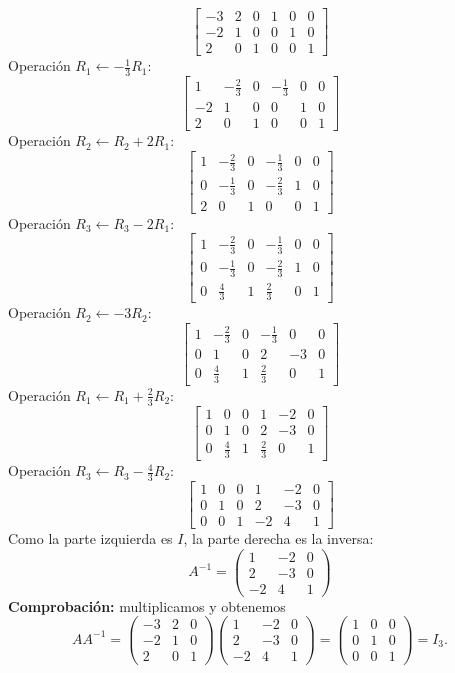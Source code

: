 \documentclass[12pt]{article}
\theoremstyle{remark}
\begin{document}
\[
\left[\begin{array}{rrr|rrr}-3&2&0&1&0&0\\-2&1&0&0&1&0\\2&0&1&0&0&1\end{array}\right]
\]
Operación $R_{1}\leftarrow - \frac{1}{3}R_{1}$:
\[
\left[\begin{array}{rrr|rrr}1&- \frac{2}{3}&0&- \frac{1}{3}&0&0\\-2&1&0&0&1&0\\2&0&1&0&0&1\end{array}\right]
\]
Operación $R_{2}\leftarrow R_{2}+2R_{1}$:
\[
\left[\begin{array}{rrr|rrr}1&- \frac{2}{3}&0&- \frac{1}{3}&0&0\\0&- \frac{1}{3}&0&- \frac{2}{3}&1&0\\2&0&1&0&0&1\end{array}\right]
\]
Operación $R_{3}\leftarrow R_{3}-2R_{1}$:
\[
\left[\begin{array}{rrr|rrr}1&- \frac{2}{3}&0&- \frac{1}{3}&0&0\\0&- \frac{1}{3}&0&- \frac{2}{3}&1&0\\0&\frac{4}{3}&1&\frac{2}{3}&0&1\end{array}\right]
\]
Operación $R_{2}\leftarrow -3R_{2}$:
\[
\left[\begin{array}{rrr|rrr}1&- \frac{2}{3}&0&- \frac{1}{3}&0&0\\0&1&0&2&-3&0\\0&\frac{4}{3}&1&\frac{2}{3}&0&1\end{array}\right]
\]
Operación $R_{1}\leftarrow R_{1}+\frac{2}{3}R_{2}$:
\[
\left[\begin{array}{rrr|rrr}1&0&0&1&-2&0\\0&1&0&2&-3&0\\0&\frac{4}{3}&1&\frac{2}{3}&0&1\end{array}\right]
\]
Operación $R_{3}\leftarrow R_{3}-\frac{4}{3}R_{2}$:
\[
\left[\begin{array}{rrr|rrr}1&0&0&1&-2&0\\0&1&0&2&-3&0\\0&0&1&-2&4&1\end{array}\right]
\]
Como la parte izquierda es $I$, la parte derecha es la inversa:
\[
\boxed{A^{-1}=\begin{pmatrix}1&-2&0\\2&-3&0\\-2&4&1\end{pmatrix}}
\]
\textbf{Comprobación:} multiplicamos y obtenemos
\[
AA^{-1}=\begin{pmatrix}-3&2&0\\-2&1&0\\2&0&1\end{pmatrix}\begin{pmatrix}1&-2&0\\2&-3&0\\-2&4&1\end{pmatrix}=\begin{pmatrix}1&0&0\\0&1&0\\0&0&1\end{pmatrix}=I_{3}.
\]
\end{document}
